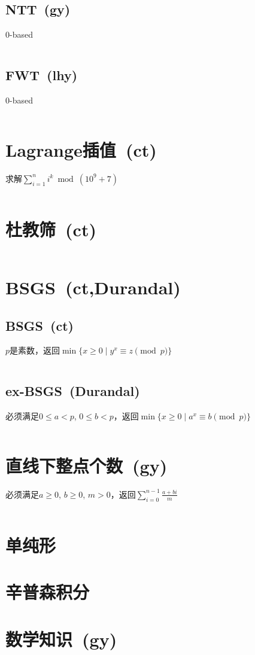 	\subsection*{NTT\ \small(gy)}
		$ 0 $-based
		\inputminted{cpp}{Math/ntt.cpp}
	\subsection*{FWT\ \small(lhy)}
		$ 0 $-based
		\inputminted{cpp}{Math/fwt.cpp}
\section{Lagrange插值\ \small(ct)}
	求解$ \sum\limits_{i = 1}^{n} i^k \bmod (10^9 + 7)$
	\inputminted{cpp}{Math/lagrange_polynomial.cpp}
\section{杜教筛\ \small(ct)}
	\inputminted{cpp}{Math/du_jiao_sieve.cpp}
\section{BSGS\ \small(ct,Durandal)}
	\subsection{BSGS\ \small(ct)}
		$ p $是素数，返回$ \min\lbrace x \geq 0 \mid y^x \equiv z \pmod p \rbrace $
		\inputminted{cpp}{Math/bsgs.cpp}
	\subsection{ex-BSGS\ \small(Durandal)}
		必须满足$ 0 \leq a < p $, $ 0 \leq b < p $，返回$ \min\lbrace x \geq 0 \mid a^x \equiv b \pmod p\rbrace $
		\inputminted{cpp}{Math/ex_bsgs.cpp}
\section{直线下整点个数\ \small(gy)}
	必须满足$ a \geq 0 $, $ b \geq 0 $, $ m > 0 $，返回$ \sum\limits_{i=0}^{n-1} \frac{a + bi}{m} $
	\inputminted{cpp}{Math/points_below_line.cpp}
\section{单纯形}
\section{辛普森积分}
\section{数学知识\ \small(gy)}
\newcommand{\eularian}{\genfrac\langle\rangle{0pt}{0}}
\newcommand{\Eularian}[2]{\left\langle\!\!\!\eularian{#1}{#2}\!\!\!\right\rangle}
